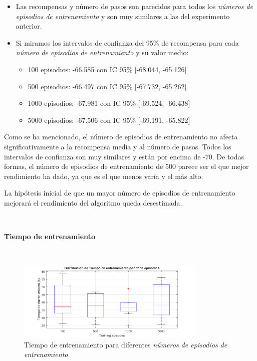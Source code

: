 \begin{itemize}
    \item Las recompensas y número de pasos son parecidos para todos los \textit{números de episodios de entrenamiento} y son muy similares a las del experimento anterior.
    \item Si miramos los intervalos de confianza del 95\% de recompensa para cada \textit{número de episodios de entrenamiento} y su valor medio:
    \begin{itemize}
        \item 100 episodios: -66.585 con IC 95\% [-68.044, -65.126]
        \item 500 episodios: -66.497 con IC 95\% [-67.732, -65.262]
        \item 1000 episodios: -67.981 con IC 95\% [-69.524, -66.438]
        \item 5000 episodios: -67.506 con IC 95\% [-69.191, -65.822]
    \end{itemize}
\end{itemize}

Como se ha mencionado, el número de episodios de entrenamiento no afecta significativamente a la recompensa media y al número de pasos. Todos los intervalos de confianza son muy similares y están por encima de -70. De todas formas, el número de episodios de entrenamiento de 500 parece ser el que mejor rendimiento ha dado, ya que es el que menos varía y el más alto.

La hipótesis inicial de que un mayor número de episodios de entrenamiento mejorará el rendimiento del algoritmo queda desestimada.

\

\textbf{Tiempo de entrenamiento}

\ 

\begin{figure}[H]
    \centering
    \includegraphics[width=0.8\textwidth]{../../experiments/directEstimation/experiment-2/results/time.png}
    \caption{Tiempo de entrenamiento para diferentes \textit{números de episodios de entrenamiento}}
    \label{fig:directEstimation2-time}
\end{figure}

